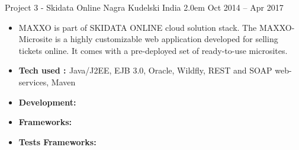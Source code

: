 \medskip
\medskip
\medskip
\medskip
\cvprojects
{Project 3 - Skidata Online}
{Nagra Kudelski India}
{2.0em}
{Oct 2014 -- Apr 2017}

\begin{itemize}

    \item 
    MAXXO is part of SKIDATA ONLINE cloud solution stack. The MAXXO-Microsite is a highly customizable web application developed for selling tickets online. It comes with a pre-deployed set of ready-to-use microsites.
    
    \item \textbf{\textcolor{accent}{Tech used : }} 
    \textcolor{accent}{
    Java/J2EE, EJB 3.0, Oracle, Wildfly, REST and SOAP web-services, Maven}

\end{itemize}







\begin{itemize}
    \item {\textbf{Development:}} 
\end{itemize}

\divider

\begin{itemize}
    \item {\textbf{Frameworks:}} 

\end{itemize}

\begin{itemize}
    \item {\textbf{Tests Frameworks:}} 
\end{itemize}

